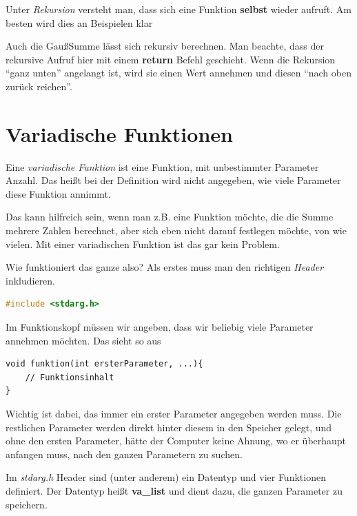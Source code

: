 \documentclass[c_worksheet.tex]{subfiles}
\begin{document}
Unter \emph{Rekursion} versteht man, dass sich eine Funktion \textbf{selbst} wieder aufruft. Am besten wird dies an Beispielen klar



Auch die GaußSumme lässt sich rekursiv berechnen. Man beachte, dass der rekursive Aufruf hier mit einem \textbf{return} Befehl geschieht. Wenn die Rekursion ``ganz unten'' angelangt ist, wird sie einen Wert annehmen und diesen ``nach oben zurück reichen''.


 



\section{Variadische Funktionen}

Eine \emph{variadische Funktion} ist eine Funktion, mit unbestimmter Parameter Anzahl. Das heißt bei der Definition wird nicht angegeben, wie viele Parameter diese Funktion annimmt.

Das kann hilfreich sein, wenn man z.B. eine Funktion möchte, die die Summe mehrere Zahlen berechnet, aber sich eben nicht darauf festlegen möchte, von wie vielen. Mit einer variadischen Funktion ist das gar kein Problem.

Wie funktioniert das ganze also? Als erstes muss man den richtigen \emph{Header} inkludieren.

\begin{lstlisting}[language=c]
 #include <stdarg.h> 	
\end{lstlisting}  

Im Funktionskopf müssen wir angeben, dass wir beliebig viele Parameter annehmen möchten. Das sieht so aus

\begin{lstlisting}
void funktion(int ersterParameter, ...){
	// Funktionsinhalt
}
\end{lstlisting}

Wichtig ist dabei, das immer ein erster Parameter angegeben werden muss. Die restlichen Parameter werden direkt hinter diesem in den Speicher gelegt, und ohne den ersten Parameter, hätte der Computer keine Ahnung, wo er überhaupt anfangen muss, nach den ganzen Parametern zu suchen.

Im \emph{stdarg.h} Header sind (unter anderem) ein Datentyp und vier Funktionen definiert. Der Datentyp heißt \textbf{va\_list} und dient dazu, die ganzen Parameter zu speichern.
\end{document}
